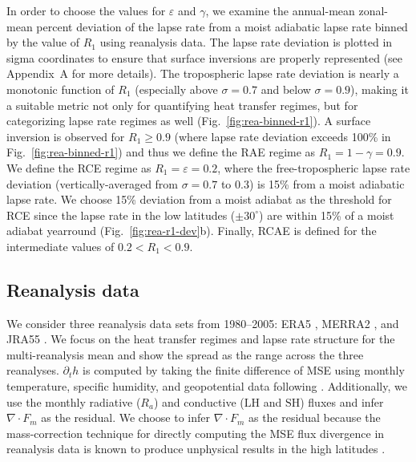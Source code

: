 \documentclass{ametsocV5}
\begin{document}
    In order to choose the values for $\varepsilon$ and $\gamma$, we examine the annual-mean zonal-mean percent deviation of the lapse rate from a moist adiabatic lapse rate binned by the value of $R_1$ using reanalysis data. The lapse rate deviation is plotted in sigma coordinates to ensure that surface inversions are properly represented (see Appendix~A for more details). The tropospheric lapse rate deviation is nearly a monotonic function of $R_1$ (especially above $\sigma=0.7$ and below $\sigma=0.9$), making it a suitable metric not only for quantifying heat transfer regimes, but for categorizing lapse rate regimes as well (Fig.~\ref{fig:rea-binned-r1}). A surface inversion is observed for $R_1 \ge 0.9$ (where lapse rate deviation exceeds 100\% in Fig.~\ref{fig:rea-binned-r1}) and thus we define the RAE regime as $R_1=1-\gamma=0.9$. We define the RCE regime as $R_1=\varepsilon=0.2$, where the free-tropospheric lapse rate deviation (vertically-averaged from $\sigma=0.7$ to 0.3) is 15\% from a moist adiabatic lapse rate. We choose 15\% deviation from a moist adiabat as the threshold for RCE since the lapse rate in the low latitudes ($\pm 30^\circ$) are within 15\% of a moist adiabat yearround (Fig.~\ref{fig:rea-r1-dev}b). Finally, RCAE is defined for the intermediate values of $0.2<R_1<0.9$.

    \subsection{Reanalysis data}\label{subsec:reanalysis}

    We consider three reanalysis data sets from 1980--2005: ERA5 \citep{hersbach2020}, MERRA2 \citep{gelaro2017}, and JRA55 \citep{kobayashi2015}. We focus on the heat transfer regimes and lapse rate structure for the multi-reanalysis mean and show the spread as the range across the three reanalyses. $\partial_t h$ is computed by taking the finite difference of MSE using monthly temperature, specific humidity, and geopotential data following \cite{donohoe2013}. Additionally, we use the monthly radiative ($R_a$) and conductive ($\mathrm{LH}$ and $\mathrm{SH}$) fluxes and infer $\nabla\cdot F_m$ as the residual. We choose to infer $\nabla\cdot F_m$ as the residual because the mass-correction technique for directly computing the MSE flux divergence in reanalysis data is known to produce unphysical results in the high latitudes \citep{porter2010}. 
\end{document}
